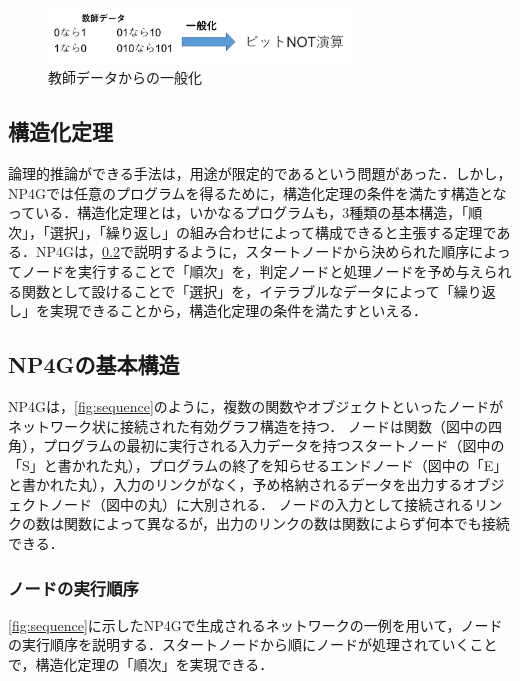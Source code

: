 \documentclass[exploratorypaper]{jsaiart} %
\begin{document}
\begin{figure}[t]
    \begin{center}
        \includegraphics[width=80mm]{summary.png}
    \end{center}
    \capwidth=80mm %
    \caption{教師データからの一般化}
    \label{fig:summary}
\end{figure}

\subsection{構造化定理}
論理的推論ができる手法は，用途が限定的であるという問題があった．しかし，NP4Gでは任意のプログラムを得るために，構造化定理の条件を満たす構造となっている．構造化定理とは，いかなるプログラムも，3種類の基本構造，「順次」，「選択」，「繰り返し」の組み合わせによって構成できると主張する定理である\cite{StructuredProgramming}．NP4Gは，\ref{sec:struct}で説明するように，スタートノードから決められた順序によってノードを実行することで「順次」を，判定ノードと処理ノードを予め与えられる関数として設けることで「選択」を，イテラブルなデータによって「繰り返し」を実現できることから，構造化定理の条件を満たすといえる．

\subsection{NP4Gの基本構造}
\label{sec:struct}
NP4Gは，\ref{fig:sequence}のように，複数の関数やオブジェクトといったノードがネットワーク状に接続された有効グラフ構造を持つ．
ノードは関数（図中の四角），プログラムの最初に実行される入力データを持つスタートノード（図中の「S」と書かれた丸），プログラムの終了を知らせるエンドノード（図中の「E」と書かれた丸），入力のリンクがなく，予め格納されるデータを出力するオブジェクトノード（図中の丸）に大別される．
ノードの入力として接続されるリンクの数は関数によって異なるが，出力のリンクの数は関数によらず何本でも接続できる．
\subsubsection{ノードの実行順序}
\label{sec:sequence}
\ref{fig:sequence}に示したNP4Gで生成されるネットワークの一例を用いて，ノードの実行順序を説明する．スタートノードから順にノードが処理されていくことで，構造化定理の「順次」を実現できる．
\end{document}
